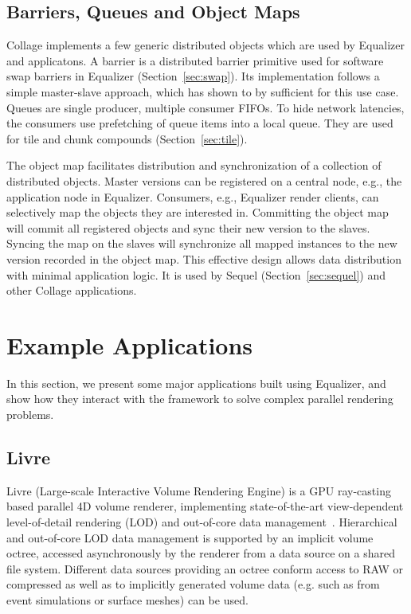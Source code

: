 \documentclass[10pt,journal,compsoc]{IEEEtran}
\newcommand{\sref}[1]{Section~\ref{#1}}
\begin{document}
\subsection{Barriers, Queues and Object Maps}\label{sec:barrier}

\textsf{Collage} implements a few generic distributed objects which are used by
\textsf{Equalizer}
and applicatons. A barrier is a distributed barrier primitive used for software
swap barriers in \textsf{Equalizer} (\sref{sec:swap}). Its implementation
follows a
simple master-slave approach, which has shown to by sufficient for this use
case. Queues are single producer, multiple consumer FIFOs. To hide network
latencies, the consumers use prefetching of queue items into a local queue. They
are used for tile and chunk compounds (\sref{sec:tile}).

The object map facilitates distribution and synchronization of a collection of
distributed objects. Master versions can be registered on a central node, e.g.,
the application node in \textsf{Equalizer}. Consumers, e.g., \textsf{Equalizer}
render clients,
can selectively map the objects they are interested in. Committing the object
map will commit all registered objects and sync their new version to the
slaves. Syncing the map on the slaves will synchronize all mapped instances to
the new version recorded in the object map. This effective design allows data
distribution with minimal application logic. It is used by \textsf{Sequel}
(\sref{sec:sequel}) and other \textsf{Collage} applications.

\section{Example Applications} \label{sApplications}

In this section, we present some major applications built using
\textsf{Equalizer}, and
show how they interact with the framework to solve complex parallel rendering
problems.

\subsection{Livre}

Livre (Large-scale Interactive Volume Rendering Engine) is a GPU ray-casting based parallel
4D volume renderer, implementing state-of-the-art view-dependent level-of-detail rendering (LOD)
and out-of-core data management~\cite{EHKRW:06}. Hierarchical and out-of-core LOD
data management is supported by an implicit volume octree, accessed asynchronously
by the renderer from a data source on a shared file system. Different data sources providing
an octree conform access to RAW or compressed as well as to implicitly generated volume data
(e.g. such as from event simulations or surface meshes) can be used.
\end{document}
